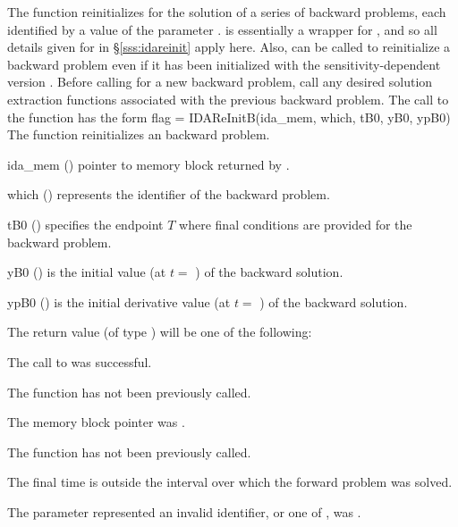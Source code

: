 The function  reinitializes {\idas} for the solution of a series
of backward problems, each identified by a value of the parameter .
 is essentially a wrapper for , and so all details
given for  in \S\ref{sss:idareinit} apply here.
Also,  can be called to reinitialize a backward problem even if it
has been initialized with the sensitivity-dependent version .
Before calling  for a new backward problem, call any
desired solution extraction functions  associated with the
previous backward problem.
The call to the  function has the form
{
  flag = IDAReInitB(ida\_mem, which, tB0, yB0, ypB0)
}
{
  The function  reinitializes an {\idas} backward problem.
}
{
  \begin{args}
  \item[ida\_mem] ()
    pointer to {\idas} memory block returned by .
  \item[which] ()
    represents the identifier of the backward problem.
  \item[tB0] ()
    specifies the endpoint $T$ where final conditions are provided for the
    backward problem.
  \item[yB0] ()
    is the initial value (at $t =$ ) of the backward solution.
  \item[ypB0] ()
    is the initial derivative value (at $t =$ ) of the backward solution.
  \end{args}
}
{
  The return value  (of type ) will be one of the following:
  \begin{args}
  \item[\Id{IDA\_SUCCESS}]
    The call to  was successful.
  \item[\Id{IDA\_NO\_MALLOC}]
    The function  has not been previously called.
  \item[\Id{IDA\_MEM\_NULL}]
    The  memory block pointer was .
  \item[\Id{IDA\_NO\_ADJ}]
    The function  has not been previously called.
  \item[\Id{IDA\_BAD\_TB0}]
    The final time  is outside the interval over which the forward problem
    was solved.
  \item[\Id{IDA\_ILL\_INPUT}]
    The parameter  represented an invalid identifier, or one
    of ,  was .
  \end{args}
}
{}

